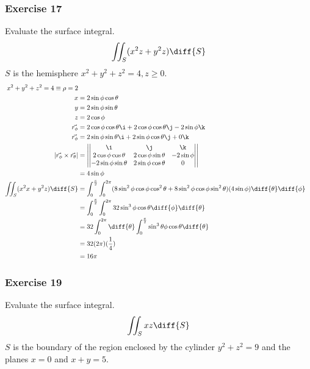 \documentclass{math}
\begin{document}
\subsubsection*{Exercise 17}
Evaluate the surface integral.
\[ \iint_{S}(x^2z+y^2z)\diff{S} \]
\( S \) is the hemisphere \( x^2+y^2+z^2 = 4, z\ge0 \).
\begin{align*}
  x^2+y^2+z^2 = 4 \equiv \rho = 2 \\
  x &= 2\sin\phi\cos\theta \\
  y &= 2\sin\phi\sin\theta \\
  z &= 2\cos\phi \\
  \vec{r_{\phi}} &= 2\cos\phi\cos\theta\i+2\cos\phi\cos\theta\j-2\sin\phi\k \\
  \vec{r_{\phi}} &= 2\sin\phi\sin\theta\i+2\sin\phi\cos\theta\j+0\k \\
  |\vec{r_{\phi}}\times\vec{r_{\theta}}| &= \left|\begin{vmatrix}
    \i & \j & \k \\
    2\cos\phi\cos\theta & 2\cos\phi\sin\theta & -2\sin\phi \\
    -2\sin\phi\sin\theta & 2\sin\phi\cos\theta & 0 \\
  \end{vmatrix}\right| \\
  &= 4\sin\phi \\
  \iint_{S}(x^2x+y^2z)\diff{S} &= \int_{0}^{\frac{\pi}{2}}\int_{0}^{2\pi}
    (8\sin^2\phi\cos\phi\cos^2\theta+8\sin^2\phi\cos\phi\sin^2\theta)
    (4\sin\phi)\diff{\theta}\diff{\phi} \\
  &= \int_{0}^{\frac{\pi}{2}}\int_{0}^{2\pi}32\sin^3\phi\cos\theta
    \diff{\phi}\diff{\theta} \\
  &= 32\int_{0}^{2\pi}\diff{\theta}
    \int_{0}^{\frac{\pi}{2}}\sin^3\theta\phi\cos\theta\diff{\theta} \\
  &= 32(2\pi)(\frac{1}{4}) \\
  &= 16\pi
\end{align*}

\subsubsection*{Exercise 19}
Evaluate the surface integral.
\[ \iint_{S}xz\diff{S} \]
\( S \) is the boundary of the region enclosed by the cylinder \( y^2+z^2 = 9 \)
and the planes \( x = 0 \) and \( x+y = 5 \).
\begin{align*}
\end{align*}
\end{document}
